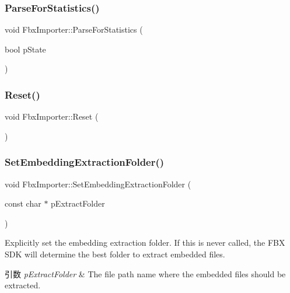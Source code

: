 \mbox{\label{class_fbx_importer_a4a3340dfe262ac8a6c3ae6ebbc793201}} 
\subsubsection{\texorpdfstring{Parse\+For\+Statistics()}{ParseForStatistics()}}
{\footnotesize\ttfamily void Fbx\+Importer\+::\+Parse\+For\+Statistics (\begin{DoxyParamCaption}\item[{bool}]{p\+State }\end{DoxyParamCaption})}

\mbox{\label{class_fbx_importer_a2c3b438ff0b69b88907092aa4664a21b}} 
\subsubsection{\texorpdfstring{Reset()}{Reset()}}
{\footnotesize\ttfamily void Fbx\+Importer\+::\+Reset (\begin{DoxyParamCaption}{ }\end{DoxyParamCaption})\hspace{0.3cm}{\ttfamily [protected]}}

\mbox{\label{class_fbx_importer_a3ba4bf6e00487b45808fa5fe052063f0}} 
\subsubsection{\texorpdfstring{Set\+Embedding\+Extraction\+Folder()}{SetEmbeddingExtractionFolder()}}
{\footnotesize\ttfamily void Fbx\+Importer\+::\+Set\+Embedding\+Extraction\+Folder (\begin{DoxyParamCaption}\item[{const char $\ast$}]{p\+Extract\+Folder }\end{DoxyParamCaption})}

Explicitly set the embedding extraction folder. If this is never called, the F\+BX S\+DK will determine the best folder to extract embedded files. 
\begin{DoxyParams}{引数}
{\em p\+Extract\+Folder} & The file path name where the embedded files should be extracted. \\
\hline
\end{DoxyParams}
\mbox{\label{class_fbx_importer_a7d601352ed7e7bd9b7f05740573ef09d}} 
